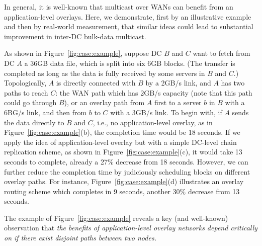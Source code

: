 In general, it is well-known that multicast over WANs can benefit
from an application-level overlays.
Here, we demonstrate, first by an illustrative example and then by
real-world measurement, that similar ideas could lead to 
substantial improvement in inter-DC bulk-data multicast.

As shown in Figure~\ref{fig:case:example},
suppose DC $B$ and $C$ want to fetch from DC $A$ a 36GB data file,
which is split into six 6GB blocks.
(The transfer is completed as long as the data is fully received
by some servers in $B$ and $C$.)
Topologically, $A$ is directly connected with $B$ by a 2GB/s
link, and $A$ has two paths to reach $C$: the WAN path
which has 2GB/s capacity
(note that this path could go through $B$), or an overlay path
from $A$ first to a server $b$ in $B$ with a 6BG/s link,
and then from $b$ to $C$ with a 3GB/s link.
To begin with, if $A$ sends the data directly to $B$ and $C$,
i.e., no application-level overlay,
as in Figure~\ref{fig:case:example}(b),
the completion time would be 18 seconds.
If we apply the idea of application-level overlay but with 
a simple DC-level chain
replication scheme, as shown in Figure~\ref{fig:case:example}(c),
it would take 13 seconds
to complete, already a 27\% decrease from 18 seconds.
However, we can further reduce the completion time
by judiciously scheduling blocks on different
overlay paths. For instance, Figure~\ref{fig:case:example}(d)
illustrates an overlay routing scheme which completes in 9
seconds, another 30\% decrease from 13 seconds.

The example of Figure~\ref{fig:case:example}
reveals a key (and well-known) observation that 
{\em the benefits of
application-level overlay networks depend critically on if
there exist disjoint paths between two nodes.}



